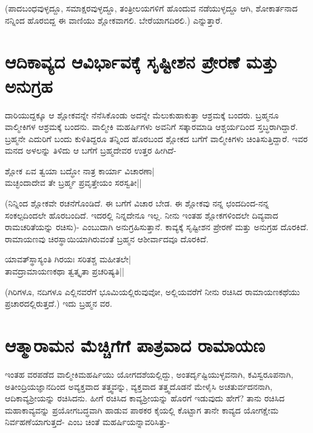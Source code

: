 (ಪಾದಬಂಧವುಳ್ಳದ್ದೂ, ಸಮಾಕ್ಷರವುಳ್ಳದ್ದೂ, ತಂತ್ರೀಲಯಗಳಿಗೆ ಹೊಂದುವ ನಡೆಯುಳ್ಳದ್ದೂ ಆಗಿ, ಶೋಕಾರ್ತನಾದ ನನ್ನಿಂದ ಹೊರಬಿದ್ದ ಈ ವಾಣಿಯು ಶ್ಲೋಕವಾಗಲಿ. ಬೇರೆಯಾಗದಿರಲಿ.) ಎನ್ನುತ್ತಾರೆ. 

\section*{ಆದಿಕಾವ್ಯದ ಆವಿರ್ಭಾವಕ್ಕೆ ಸೃಷ್ಟೀಶನ ಪ್ರೇರಣೆ ಮತ್ತು ಅನುಗ್ರಹ} 

ದಾರಿಯುದ್ದಕ್ಕೂ ಆ ಶ್ಲೋಕವನ್ನೇ ನೆನೆಸಿಕೊಂಡು ಅದನ್ನೇ ಮೆಲುಕುಹಾಕುತ್ತಾ ಆಶ್ರಮಕ್ಕೆ ಬಂದರು. ಬ್ರಹ್ಮನೂ ವಾಲ್ಮೀಕಿಗಳ ಆಶ್ರಮಕ್ಕೆ ಬಂದನು. ವಾಲ್ಮೀಕಿ ಮಹರ್ಷಿಗಳು ಅವನಿಗೆ ಸತ್ಕಾರಮಾಡಿ ಆಶ್ಚರ್ಯದಿಂದ ಸ್ತಬ್ಧರಾಗಿದ್ದಾರೆ. ಬ್ರಹ್ಮನೇ ಎದುರಿಗೆ ಬಂದು ಕುಳಿತಿದ್ದರೂ ತನ್ನಿಂದ ಹೊರಬಂದ ಶ್ಲೋಕದ ಬಗೆಗೆ ವಾಲ್ಮೀಕಿಗಳು ಚಿಂತಿಸುತ್ತಿದ್ದಾರೆ. ಇವರ ಮನದ ಅಳಲನ್ನು ತಿಳಿದು ಆ ಬಗೆಗೆ ಬ್ರಹ್ಮದೇವರ ಉತ್ತರ ಹೀಗಿದೆ- 

\begin{shloka} 
ಶ್ಲೋಕ ಏವ ತ್ವಯಾ ಬದ್ಧೋ ನಾತ್ರ ಕಾರ್ಯಾ ವಿಚಾರಣಾ|\label{157c}\\ 
ಮಚ್ಛಂದಾದೇವ ತೇ ಬ್ರರ್ಹ್ಮ ಪ್ರವೃತ್ತೇಯಂ ಸರಸ್ವತೀ||
\end{shloka} 

(ನಿನ್ನಿಂದ ಶ್ಲೋಕವೇ ರಚನೆಗೊಂಡಿದೆ. ಈ ಬಗೆಗೆ ವಿಚಾರ ಬೇಡ. ಈ ಶ್ಲೋಕವು ನನ್ನ ಛಂದದಿಂದ-ನನ್ನ ಸಂಕಲ್ಪದಿಂದಲೇ ಹೊರಬಂದಿದೆ. ಇದರಲ್ಲಿ ನಿನ್ನದೇನೂ ಇಲ್ಲ. ನೀನು ಇಂತಹ ಶ್ಲೋಕಗಳಿಂದಲೇ ದಿವ್ಯವಾದ ರಾಮಚರಿತೆಯನ್ನು ರಚಿಸು)- ಎಂಬುದಾಗಿ ಅನುಗ್ರಹಿಸುತ್ತಾನೆ. ಕಾವ್ಯಕ್ಕೆ ಸೃಷ್ಟೀಶನ ಪ್ರೇರಣೆ ಮತ್ತು ಅನುಗ್ರಹ ದೊರಕಿದೆ. ರಾಮಾಯಣವು ಚಿರಸ್ಥಾಯಿಯಾಗಿರುವಂತೆ ಬ್ರಹ್ಮನ ಆಶೀರ್ವಾದವೂ ದೊರಕಿದೆ. 

\begin{shloka} 
ಯಾವತ್‍ಸ್ಥಾಸ್ಯಂತಿ ಗಿರಯಃ ಸರಿತಶ್ಚ ಮಹೀತಲೇ|\label{158b}\\ 
ತಾವದ್ರಾಮಾಯಣಕಥಾ ತ್ವತ್ಕೃತಾ ಪ್ರಚರಿಷ್ಯತಿ||
\end{shloka} 

(ಗಿರಿಗಳೂ, ನದಿಗಳೂ ಎಲ್ಲಿನವರೆಗೆ ಭೂಮಿಯಲ್ಲಿರುವುವೋ, ಅಲ್ಲಿಯವರೆಗೆ ನೀನು ರಚಿಸಿದ ರಾಮಾಯಣಕಥೆಯು ಪ್ರಚಾರದಲ್ಲಿರುತ್ತದೆ.) ಇದು ಬ್ರಹ್ಮನ ವರ. 

\section*{ಆತ್ಮಾರಾಮನ ಮೆಚ್ಚಿಗೆಗೆ ಪಾತ್ರವಾದ ರಾಮಾಯಣ} 

ಇಂತಹ ವರಪಡೆದ ವಾಲ್ಮೀಕಿಮಹರ್ಷಿಯು ಯೋಗದಶೆಯಲ್ಲಿದ್ದು, ಅಂತರ್ದೃಷ್ಟಿಯುಳ್ಳವನಾಗಿ, ಕವಿಸ್ವರೂಪನಾಗಿ, ಅತೀಂದ್ರಿಯಜ್ಞಾನದಿಂದ ಅವ್ಯಕ್ತವಾದ ತತ್ತ್ವವನ್ನು, ವ್ಯಕ್ತವಾದ ತತ್ತ್ವದೊಡನೆ ಮೇಳೈಸಿ ಅಚತುರ್ವದನನಾಗಿ, ಆದಿಕಾವ್ಯಶ್ರೀಯನ್ನು ರಚಿಸಿದನು. ಹೀಗೆ ರಚಿಸಿದ ಕಾವ್ಯಶ್ರೀಯನ್ನು ಹೊರಗೆ ಇಡುವುದು ಹೇಗೆ? ತಾನು ರಚಿಸಿದ ಮಹಾಕಾವ್ಯವನ್ನು ಪ್ರಯೋಗಬದ್ಧವಾಗಿ ಹಾಡುವ ಪಾಠಕರ ಕೈಯಲ್ಲಿ ಕೊಟ್ಟಾಗ ತಾನೇ ಕಾವ್ಯದ ಯೋಗಕ್ಷೇಮ ನಿರ್ವಹಣೆಯಾಗುತ್ತದೆ- ಎಂಬ ಚಿಂತೆ ಮಹರ್ಷಿಯನ್ನಾವರಿಸಿತ್ತು- 

